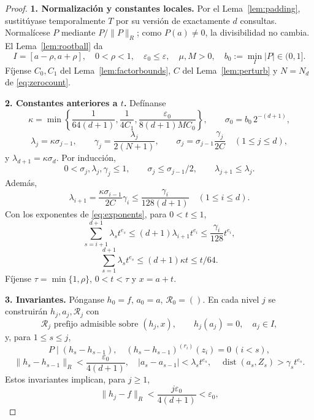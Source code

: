 \documentclass[11pt,a4paper]{article}
\numberwithin{equation}{section}
\theoremstyle{definition}
\theoremstyle{remark}
\newcommand{\Rec}{\mathcal R}
\DeclareMathOperator{\dist}{dist}
\newcommand{\paso}[1]{\par\smallskip\noindent\textbf{#1}\quad}
\begin{document}
\begin{proof}
\paso{1. Normalización y constantes locales.}
Por el Lema~\ref{lem:padding}, sustitúyase temporalmente $T$ por su versión de exactamente $d$ consultas. Normalícese $P$ mediante $P/\|P\|_R$; como $P(a)\ne0$, la divisibilidad no cambia. El Lema~\ref{lem:rootball} da
\[
I=[a-\rho,a+\rho],\quad0<\rho<1,\quad\varepsilon_0\le\varepsilon,\quad\mu,M>0,
\quad b_0:=\min_I|P|\in(0,1].
\]
Fíjense $C_0,C_1$ del Lema~\ref{lem:factorbounds}, $C$ del Lema~\ref{lem:perturb} y $N=N_d$ de \eqref{eq:zerocount}.
\paso{2. Constantes anteriores a $t$.}
Defínanse
\begin{equation}\label{eq:kappa}
\kappa=\min\left\{\frac1{64(d+1)},\frac1{4C_1},
\frac{\varepsilon_0}{8(d+1)MC_0}\right\},\qquad\sigma_0=b_0\,2^{-(d+1)},
\end{equation}
\begin{equation}\label{eq:constants}
\lambda_j=\kappa\sigma_{j-1},\qquad
\gamma_j=\frac{\lambda_j}{2(N+1)},\qquad
\sigma_j=\sigma_{j-1}\frac{\gamma_j}{2C}\quad(1\le j\le d),
\end{equation}
y $\lambda_{d+1}=\kappa\sigma_d$. Por inducción,
\[
0<\sigma_j,\lambda_j,\gamma_j\le1,\qquad
\sigma_j\le\sigma_{j-1}/2,\qquad\lambda_{j+1}\le\lambda_j.
\]
Además,
\begin{equation}\label{eq:lambdagamma}
\lambda_{i+1}=\frac{\kappa\sigma_{i-1}}{2C}\gamma_i
\le\frac{\gamma_i}{128(d+1)}\quad(1\le i\le d).
\end{equation}
Con los exponentes de \eqref{eq:exponents}, para $0<t\le1$,
\begin{equation}\label{eq:tailstage}
\sum_{s=i+1}^{d+1}\lambda_st^{e_s}
\le(d+1)\lambda_{i+1}t^{e_i}\le\frac{\gamma_i}{128}t^{e_i},
\end{equation}
\begin{equation}\label{eq:totalstage}
\sum_{s=1}^{d+1}\lambda_st^{e_s}\le(d+1)\kappa t\le t/64.
\end{equation}
Fíjense $\tau=\min\{1,\rho\}$, $0<t<\tau$ y $x=a+t$.
\paso{3. Invariantes.}
Pónganse $h_0=f$, $a_0=a$, $\Rec_0=()$. En cada nivel $j$ se construirán $h_j,a_j,\Rec_j$ con
\[
\Rec_j\text{ prefijo admisible sobre }(h_j,x),\qquad h_j(a_j)=0,\quad a_j\in I,
\]
y, para $1\le s\le j$,
\[
P\mid(h_s-h_{s-1}),\quad
(h_s-h_{s-1})^{(r_i)}(z_i)=0\ (i<s),
\]
\[
\|h_s-h_{s-1}\|_R<\frac{\varepsilon_0}{4(d+1)},\quad
|a_s-a_{s-1}|<\lambda_st^{e_s},\quad
\dist(a_s,Z_s)>\gamma_st^{e_s}.
\]
Estos invariantes implican, para $j\ge1$,
\begin{equation}\label{eq:ballstage}
\|h_j-f\|_R<\frac{j\varepsilon_0}{4(d+1)}<\varepsilon_0,

\end{equation}
\end{proof}
\end{document}
